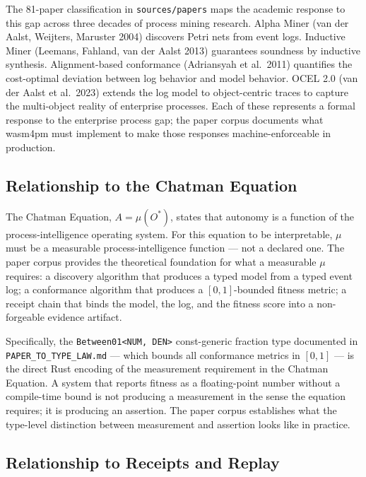The 81-paper classification in \texttt{sources/papers} maps the academic
response to this gap across three decades of process mining research. Alpha
Miner (van der Aalst, Weijters, Maruster 2004) discovers Petri nets from event
logs. Inductive Miner (Leemans, Fahland, van der Aalst 2013) guarantees
soundness by inductive synthesis. Alignment-based conformance (Adriansyah
et al.\ 2011) quantifies the cost-optimal deviation between log behavior and
model behavior. OCEL 2.0 (van der Aalst et al.\ 2023) extends the log model
to object-centric traces to capture the multi-object reality of enterprise
processes. Each of these represents a formal response to the enterprise process
gap; the paper corpus documents what wasm4pm must implement to make those
responses machine-enforceable in production.

\subsection{Relationship to the Chatman Equation}
\label{sec:sources-papers-lineage-chatman}

The Chatman Equation, $A = \mu(O^*)$, states that autonomy is a function of
the process-intelligence operating system. For this equation to be
interpretable, $\mu$ must be a measurable process-intelligence function ---
not a declared one. The paper corpus provides the theoretical foundation for
what a measurable $\mu$ requires: a discovery algorithm that produces a typed
model from a typed event log; a conformance algorithm that produces a
$[0,1]$-bounded fitness metric; a receipt chain that binds the model, the log,
and the fitness score into a non-forgeable evidence artifact.

Specifically, the \texttt{Between01<NUM, DEN>} const-generic fraction type
documented in \texttt{PAPER\_TO\_TYPE\_LAW.md} --- which bounds all
conformance metrics in $[0,1]$ --- is the direct Rust encoding of the
measurement requirement in the Chatman Equation. A system that reports fitness
as a floating-point number without a compile-time bound is not producing a
measurement in the sense the equation requires; it is producing an assertion.
The paper corpus establishes what the type-level distinction between measurement
and assertion looks like in practice.

\subsection{Relationship to Receipts and Replay}
\label{sec:sources-papers-lineage-receipts}

